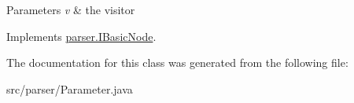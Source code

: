 \begin{DoxyParams}{Parameters}
{\em v} & the visitor \\
\hline
\end{DoxyParams}


Implements \hyperlink{interfaceparser_1_1_i_basic_node_af8790b7076c59e00781ba3d4118757cd}{parser.\+I\+Basic\+Node}.



The documentation for this class was generated from the following file\+:\begin{DoxyCompactItemize}
\item 
src/parser/Parameter.\+java\end{DoxyCompactItemize}
